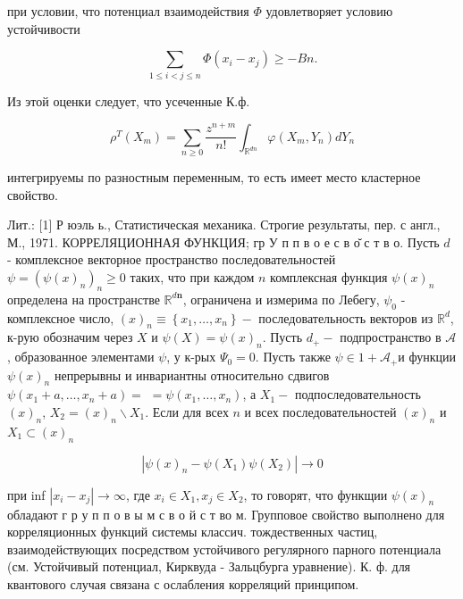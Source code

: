 \documentclass[10pt]{article}
\begin{document}
при условии, что потенциал взаимодействия $\Phi$ удовлетворяет условию устойчивости



\[

\sum_{1 \leqslant i<j \leqslant n} \Phi\left(x_{i}-x_{j}\right) \geqslant-B n .

\]



Из этой оценки следует, что усеченные К.ф.



\[

\rho^{T}\left(X_{m}\right)=\sum_{n \geqslant 0} \frac{z^{n+m}}{n !} \int_{\mathbb{R}^{d n}} \varphi\left(X_{m}, Y_{n}\right) d Y_{n}

\]



интегрируемы по разностным переменным, то есть имеет место кластерное свойство.



Лит.: [1] Р юэль ь., Статистическая механика. Строгие результаты, пер. с англ., М., 1971. КОРРЕЛЯЦИОННАЯ ФУНКЦИЯ; гр У п п в о е с в о̆ с т в о. Пусть $d$ - комплексное векторное пространство последовательностей $\psi=\left(\psi(x)_{n}\right)_{n} \geqslant 0$ таких, что при каждом $n$ комплексная функция $\psi(x)_{n}$ определена на пространстве $\mathbb{R}^{d \boldsymbol{n}}$, ограничена и измерима по Лебегу, $\psi_{0}$ - комплексное число, $(x)_{n} \equiv\left\{x_{1}, \ldots, x_{n}\right\}-$ последовательность векторов из $\mathbb{R}^{d}$, к-рую обозначим через $X$ и $\psi(X)=\psi(x)_{n}$. Пусть $d_{+}-$ подпространство в $\mathscr{A}$, образованное элементами $\psi$, у к-рых $\Psi_{0}=0$. Пусть также $\psi \in 1+\mathscr{A}_{+}$и функции $\psi(x)_{n}$ непрерывны и инвариантны относительно сдвигов $\psi\left(x_{1}+a, \ldots, x_{n}+a\right)=$ $=\psi\left(x_{1}, \ldots, x_{n}\right)$, а $X_{1}-$ подпоследовательность $(x)_{n}$, $X_{2}=(x)_{n} \backslash X_{1}$. Если для всех $n$ и всех последовательностей $(x)_{n}$ и $X_{1} \subset(x)_{n}$



\[

\left|\psi(x)_{n}-\psi\left(X_{1}\right) \psi\left(X_{2}\right)\right| \rightarrow 0

\]



при inf $\left|x_{i}-x_{j}\right| \rightarrow \infty$, где $x_{i} \in X_{1}, x_{j} \in X_{2}$, то говорят, что функщии $\psi(x)_{n}$ обладают г р у п п о в ы м с в о й с т во м. Групповое свойство выполнено для корреляционных функций системы классич. тождественных частиц, взаимодействующих посредством устойчивого регулярного парного потенциала (см. Устойчивый потенциал, Кирквуда - Зальцбурга уравнение). К. ф. для квантового случая связана с ослабления корреляций принципом.
\end{document}
